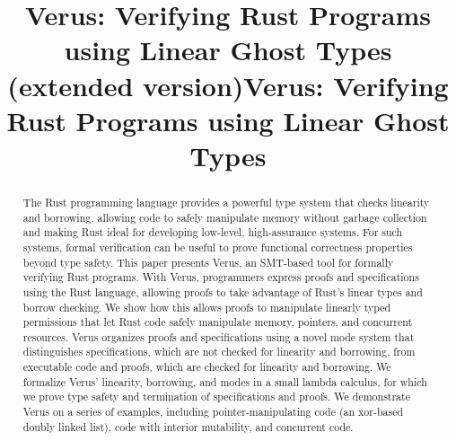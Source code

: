\documentclass[acmsmall,screen,authorversion,nonacm,review=false,timestamp=false]{acmart}\settopmatter{printccs=false,printacmref=false}
\newcommand*{\verus}[0]{Verus\xspace}
\begin{document}
\ifextended
\title{\verus: Verifying Rust Programs using Linear Ghost Types (extended version)}
\else
\title{\verus: Verifying Rust Programs using Linear Ghost Types}
\fi



\begin{abstract}
The Rust programming language provides a powerful type system that checks linearity and borrowing,
allowing code to safely manipulate memory without garbage collection and
making Rust ideal for developing low-level, high-assurance systems.
For such systems, formal verification can be useful
to prove functional correctness properties beyond type safety.
This paper presents Verus, an SMT-based tool for formally verifying Rust programs.
With Verus, programmers express proofs and specifications using the Rust language,
allowing proofs to take advantage of Rust's linear types and borrow checking.
We show how this allows proofs to manipulate linearly typed permissions
that let Rust code safely manipulate memory, pointers, and concurrent resources.
Verus organizes proofs and specifications using a novel mode system that distinguishes
specifications, which are not checked for linearity and borrowing, from executable code and proofs,
which are checked for linearity and borrowing.
We formalize Verus' linearity, borrowing, and modes in a small lambda calculus,
for which we prove type safety and termination of specifications and proofs.
We demonstrate Verus on a series of examples, including pointer-manipulating code
(an xor-based doubly linked list), code with interior mutability, and concurrent code.
\end{abstract}



\maketitle
\end{document}
